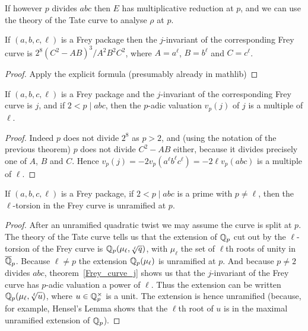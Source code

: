 If however $p$ divides $abc$ then $E$ has multiplicative 
reduction at $p$, and we can use the theory of the Tate curve to analyse $\rho$ at $p$.

\begin{theorem}\label{Frey_curve_j} If $(a,b,c,\ell)$ is a Frey package then the $j$-invariant of the corresponding Frey curve is $2^8(C^2-AB)^3/A^2B^2C^2$, where $A=a^\ell$, $B=b^\ell$ and $C=c^\ell$.
\end{theorem}
\begin{proof}
  Apply the explicit formula (presumably already in mathlib)
\end{proof}

\begin{corollary}\label{Frey_curve_val_j} If $(a,b,c,\ell)$ is a Frey package and the $j$-invariant of the corresponding Frey curve is $j$, and if $2<p\mid abc$, then the $p$-adic valuation $v_p(j)$ of $j$ is a multiple of $\ell$.
\end{corollary}
\begin{proof} Indeed $p$ does not divide $2^8$ as $p>2$, and (using the notation of the previous theorem) $p$ does not divide $C^2-AB$ either, because it divides precisely one of $A$, $B$ and $C$. Hence $v_p(j)=-2v_p(a^\ell b^\ell c^\ell)=-2\ell v_p(abc)$ is a multiple of $\ell$.
\end{proof}

\begin{corollary}\label{Frey_curve_unram} If $(a,b,c,\ell)$ is a Frey package, if $2<p\mid abc$
  is a prime with $p\not=\ell$, then the $\ell$-torsion in the Frey curve is unramified
  at $p$.
\end{corollary}
\begin{proof} After an unramified quadratic twist we may assume the curve is split at $p$.
  The theory of the Tate curve tells us that the extension of $\mathbb{Q}_p$ cut out by the $\ell$-torsion
  of the Frey curve is $\mathbb{Q}_p(\mu_\ell,\sqrt[\ell]{q})$, with $\mu_\ell$ the set of $\ell$th roots
  of unity in $\overline{\mathbb{Q}}_p$. Because $\ell\not=p$ the extension
  $\mathbb{Q}_p(\mu_\ell)$ is unramified at $p$. And because $p\not=2$ divides $abc$, 
  theorem~\ref{Frey_curve_j} shows us that the $j$-invariant of the Frey curve has $p$-adic
  valuation a power of $\ell$. Thus the extension can be written $\mathbb{Q}_p(\mu_\ell,\sqrt[\ell]{u})$,
  where $u\in\mathbb{Q}_p^\times$ is a unit. The extension is hence unramified (because, for example,
  Hensel's Lemma shows that the $\ell$th root of $u$ is in the maximal unramified
  extension of $\mathbb{Q}_p$).
\end{proof}

